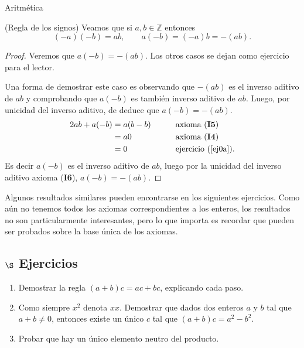 \begin{section}{Aritmética}
\begin{ejemplo*} (Regla de los signos) Veamos que  si $a,b \in \mathbb Z$ entonces
$$
(-a)(-b) = ab ,\qquad a(-b) = (-a)b = -(ab).
$$
\end{ejemplo*}
\begin{proof}
Veremos que  $a(-b) = -(ab)$. Los otros casos se dejan como ejercicio para el lector.

Una forma de demostrar este caso es  observando que $-(ab)$ es el inverso aditivo de $ab$ y comprobando que $a(-b)$ es también inverso aditivo de $ab$. Luego, por unicidad del inverso aditivo, de deduce que $a(-b) = -(ab)$. 
\begin{alignat*}2
ab + a(-b) &=a(b-b) &\qquad &\text{axioma (\textbf{I5})} \\
&=a0 &\qquad &\text{axioma (\textbf{I4})}\\
&= 0 &\qquad &\text{ejercicio (\ref{ej0a})}.
\end{alignat*}
Es decir $a(-b)$ es el inverso aditivo de $ab$, luego por la unicidad del inverso aditivo axioma (\textbf{I6}), $a(-b)=-(ab)$.
\end{proof}


Algunos resultados similares pueden encontrarse en los siguientes ejercicios. Como aún no tenemos todos los axiomas correspondientes a los enteros, los resultados no son particularmente interesantes, pero lo que importa es recordar que pueden ser probados sobre la base única de los axiomas.

\subsection*{\large $\S$ Ejercicios}

\begin{enumerate}
\item Demostrar la regla $(a+b)c=ac+bc$, explicando cada paso.

\item Como siempre $x^2$ denota $xx$. Demostrar que dados dos enteros $a$ y $b$ tal que $a+b \not=0$, entonces existe un único $c$ tal que $(a+b)c=
a^2 - b^2$.

\item \label{ej-elem-neutro-prod}Probar que hay un único elemento neutro del producto.


\end{enumerate}
\end{section}
